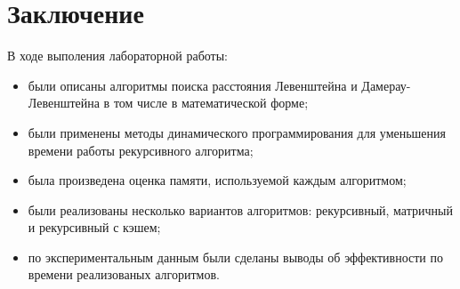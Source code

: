 \chapter*{Заключение}

В ходе выполения лабораторной работы:

\begin{itemize}[left=\parindent]
    \item были описаны алгоритмы поиска расстояния Левенштейна и Дамерау-Левенштейна в том числе в математической форме;
    \item были применены методы динамического программирования для уменьшения времени работы рекурсивного алгоритма;
    \item была произведена оценка памяти, используемой каждым алгоритмом;
    \item были реализованы несколько вариантов алгоритмов: рекурсивный, матричный и рекурсивный с кэшем;
    \item по экспериментальным данным были сделаны выводы об эффективности по времени реализованых алгоритмов.
\end{itemize}
